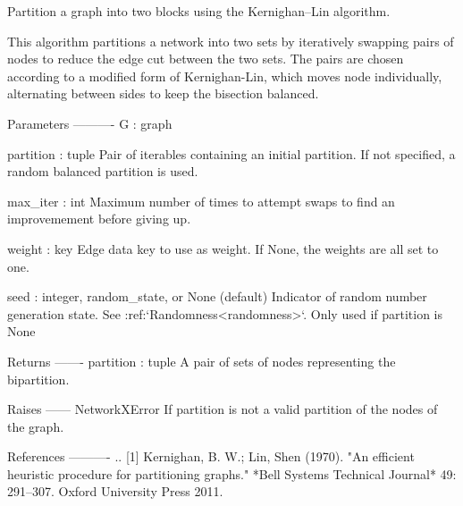 \begin{DoxyVerb}Partition a graph into two blocks using the Kernighan–Lin
algorithm.

This algorithm partitions a network into two sets by iteratively
swapping pairs of nodes to reduce the edge cut between the two sets.  The
pairs are chosen according to a modified form of Kernighan-Lin, which
moves node individually, alternating between sides to keep the bisection
balanced.

Parameters
----------
G : graph

partition : tuple
    Pair of iterables containing an initial partition. If not
    specified, a random balanced partition is used.

max_iter : int
    Maximum number of times to attempt swaps to find an
    improvemement before giving up.

weight : key
    Edge data key to use as weight. If None, the weights are all
    set to one.

seed : integer, random_state, or None (default)
    Indicator of random number generation state.
    See :ref:`Randomness<randomness>`.
    Only used if partition is None

Returns
-------
partition : tuple
    A pair of sets of nodes representing the bipartition.

Raises
------
NetworkXError
    If partition is not a valid partition of the nodes of the graph.

References
----------
.. [1] Kernighan, B. W.; Lin, Shen (1970).
   "An efficient heuristic procedure for partitioning graphs."
   *Bell Systems Technical Journal* 49: 291--307.
   Oxford University Press 2011.\end{DoxyVerb}
 